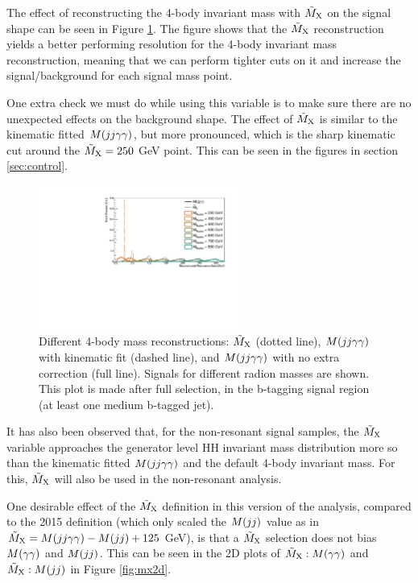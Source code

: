 The effect of reconstructing the 4-body invariant mass with $\tilde{M}_{\mathrm{X}}$ on the signal shape can be seen in Figure \ref{fig:mx}. 
The figure shows that the $\tilde{M}_{\mathrm{X}}$ reconstruction yields a better performing resolution for the 4-body invariant mass reconstruction, meaning that we can perform tighter cuts on it and increase the signal/background for each signal mass point.

One extra check we must do while using this variable is to make sure there are no unexpected effects on the background shape. 
The effect of $\tilde{M}_{\mathrm{X}}$ is similar to the kinematic fitted $M(jj\gamma\gamma)$, but more pronounced, which is the sharp kinematic cut around the $\tilde{M}_{\mathrm{X}} = 250$ GeV point. This can be seen in the figures in section \ref{sec:control}.

\begin{figure}[h]
  \centering
  \includegraphics[width=0.6\textwidth]{figures/sec-window/prplot.pdf}\hfil
  \caption{Different 4-body mass reconstructions: $\tilde{M}_{\mathrm{X}}$ (dotted line), $M(jj\gamma\gamma)$ with kinematic fit (dashed line), and $M(jj\gamma\gamma)$ with no extra correction (full line). Signals for different radion masses are shown. 
  This plot is made after full selection, in the b-tagging signal region (at least one medium b-tagged jet).}
  \label{fig:mx}
\end{figure}

It has also been observed that, for the non-resonant signal samples, the $\tilde{M}_{\mathrm{X}}$ variable approaches the generator level HH invariant mass distribution more so than the kinematic fitted $M(jj\gamma\gamma)$ and the default 4-body invariant mass. For this, $\tilde{M}_{\mathrm{X}}$ will also be used in the non-resonant analysis.

One desirable effect of the $\tilde{M}_{\mathrm{X}}$ definition in this version of the analysis, compared to the 2015 definition (which only scaled the $M(jj)$ value as in $\tilde{M}_{\mathrm{X}} = M(jj\gamma\gamma) - M(jj) + 125$ GeV), is that a $\tilde{M}_{\mathrm{X}}$ selection does not bias $M(\gamma\gamma)$ and $M(jj)$. 
This can be seen in the 2D plots of $\tilde{M}_{\mathrm{X}}:M(\gamma\gamma)$ and $\tilde{M}_{\mathrm{X}}:M(jj)$ in Figure \ref{fig:mx2d}. 

